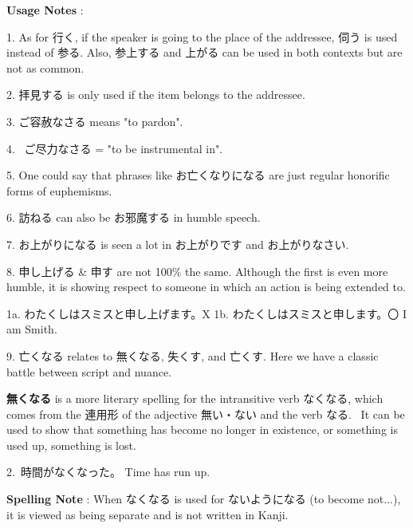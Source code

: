 \par{\textbf{Usage Notes }: }
 
\par{1. As for 行く, if the speaker is going to the place of the addressee, 伺う is used instead of 参る. Also, 参上する and 上がる can be used in both contexts but are not as common. }
 
\par{2. 拝見する is only used if the item belongs to the addressee. }
 
\par{3. ご容赦なさる means "to pardon". }
 
\par{4.  ご尽力なさる = "to be instrumental in". }
 
\par{5. One could say that phrases like お亡くなりになる are just regular honorific forms of euphemisms. }
 
\par{6. 訪ねる can also be お邪魔する in humble speech. }
 
\par{7. お上がりになる is seen a lot in お上がりです and お上がりなさい. }
 
\par{8. 申し上げる \& 申す are not 100\% the same. Although the first is even more humble, it is showing respect to someone in which an action is being extended to. }
 
\par{1a. わたくしはスミスと申し上げます。X \hfill\break
1b. わたくしはスミスと申します。〇 \hfill\break
I am Smith. }

\par{9. 亡くなる relates to 無くなる, 失くす, and 亡くす. Here we have a classic battle between script and nuance. }

\par{\textbf{ 無くなる }is a more literary spelling for the intransitive verb なくなる, which comes from the 連用形 of the adjective 無い・ない and the verb なる.  It can be used to show that something has become no longer in existence, or something is used up, something is lost. }
 
\par{2. 時間がなくなった。 \hfill\break
Time has run up. }
 
\par{\textbf{Spelling Note }: When なくなる is used for ないようになる (to become not\dothyp{}\dothyp{}\dothyp{}), it is viewed as being separate and is not written in Kanji. }


